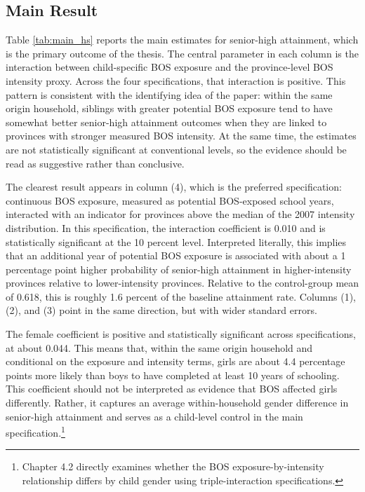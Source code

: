 \documentclass[a4paper, 12pt]{article}
\begin{document}
\begin{doublespacing}
\subsection{Main Result}
Table \ref{tab:main_hs} reports the main estimates for senior-high attainment, which is the primary outcome of the thesis. The central parameter in each column is the interaction between child-specific BOS exposure and the province-level BOS intensity proxy. Across the four specifications, that interaction is positive. This pattern is consistent with the identifying idea of the paper: within the same origin household, siblings with greater potential BOS exposure tend to have somewhat better senior-high attainment outcomes when they are linked to provinces with stronger measured BOS intensity. At the same time, the estimates are not statistically significant at conventional levels, so the evidence should be read as suggestive rather than conclusive.

The clearest result appears in column (4), which is the preferred specification: continuous BOS exposure, measured as potential BOS-exposed school years, interacted with an indicator for provinces above the median of the 2007 intensity distribution. In this specification, the interaction coefficient is 0.010 and is statistically significant at the 10 percent level. Interpreted literally, this implies that an additional year of potential BOS exposure is associated with about a 1 percentage point higher probability of senior-high attainment in higher-intensity provinces relative to lower-intensity provinces. Relative to the control-group mean of 0.618, this is roughly 1.6 percent of the baseline attainment rate. Columns (1), (2), and (3) point in the same direction, but with wider standard errors.

The female coefficient is positive and statistically significant across specifications, at about 0.044. This means that, within the same origin household and conditional on the exposure and intensity terms, girls are about 4.4 percentage points more likely than boys to have completed at least 10 years of schooling. This coefficient should not be interpreted as evidence that BOS affected girls differently. Rather, it captures an average within-household gender difference in senior-high attainment and serves as a child-level control in the main specification.\footnote{Chapter 4.2 directly examines whether the BOS exposure-by-intensity relationship differs by child gender using triple-interaction specifications.}


\end{doublespacing}
\end{document}
